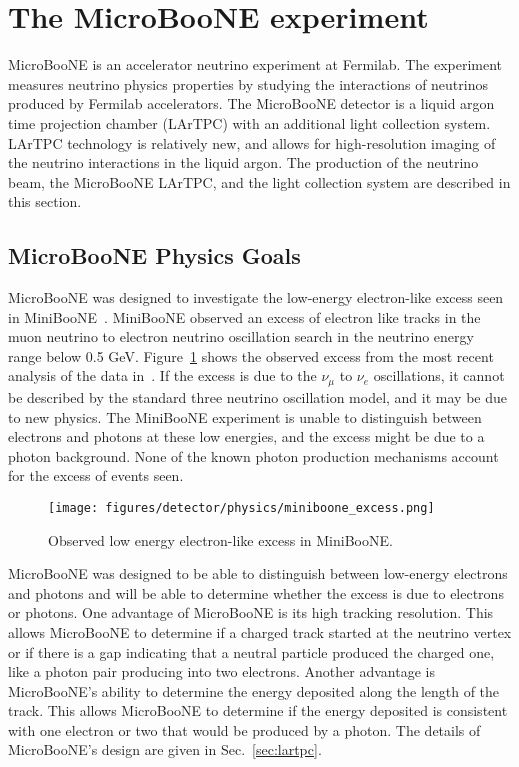 \section{The MicroBooNE experiment}\label{microboone}
MicroBooNE is an accelerator neutrino experiment at Fermilab. The experiment
measures neutrino physics properties by studying the interactions of neutrinos
produced by Fermilab accelerators. The MicroBooNE detector is a liquid argon
time projection chamber (LArTPC) with an additional light collection system.
LArTPC technology is relatively new, and allows for high-resolution imaging of
the neutrino interactions in the liquid argon. The production of the neutrino
beam, the MicroBooNE LArTPC, and the light collection system are described in
this section.
\subsection{MicroBooNE Physics Goals}\label{sec:uboonephysics}
  MicroBooNE was designed to investigate the low-energy electron-like excess
  seen in MiniBooNE~\cite{Aguilar-Arevalo:2010wv,Aguilar-Arevalo:2018gpe}.
  MiniBooNE observed an excess of electron like tracks in the muon neutrino to
  electron neutrino oscillation search in the neutrino energy range below 0.5
  GeV. Figure~\ref{fig:miniboonelee} shows the observed excess from the most
  recent analysis of the data in~\cite{Aguilar-Arevalo:2018gpe}. If the excess
  is due to the $\nu_{\mu}$ to $\nu_e$ oscillations, it cannot be described by
  the standard three neutrino oscillation model, and it may be due to new
  physics.  The MiniBooNE experiment is unable to distinguish between electrons
  and photons at these low energies, and the excess might be due to a photon
  background. None of the known photon production mechanisms account for the
  excess of events seen.

  \begin{figure}[h]
    \centering
    \texttt{[image: figures/detector/physics/miniboone\_excess.png]}
    \caption{Observed low energy electron-like excess in MiniBooNE.}
    \label{fig:miniboonelee}
  \end{figure}

  MicroBooNE was designed to be able to distinguish between low-energy
  electrons and photons and will be able to determine whether the excess is due
  to electrons or photons. One advantage of MicroBooNE is its high tracking
  resolution. This allows MicroBooNE to determine if a charged track started at
  the neutrino vertex or if there is a gap indicating that a neutral particle
  produced the charged one, like a photon pair producing into two electrons.
  Another advantage is MicroBooNE's ability to determine the energy deposited
  along the length of the track. This allows MicroBooNE to determine if the
  energy deposited is consistent with one electron or two that would be
  produced by a photon. The details of MicroBooNE's design are given in
  Sec.~\ref{sec:lartpc}.

